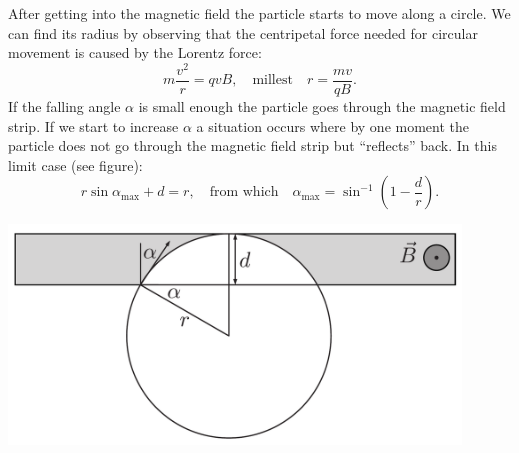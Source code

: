 {\ifEngSolution
After getting into the magnetic field the particle starts to move along a circle. We can find its radius by observing that the centripetal force needed for circular movement is caused by the Lorentz force:
\[m\frac{v^2}{r}=qvB, \quad \text{millest} \quad r=\frac{mv}{qB}.\]
If the falling angle $\alpha$ is small enough the particle goes through the magnetic field strip. If we start to increase $\alpha$ a situation occurs where by one moment the particle does not go through the magnetic field strip but “reflects” back. In this limit case (see figure):
\[r\sin\alpha_\text{max}+d=r, \quad \text{from which} \quad \alpha_\text{max}=\sin^{-1}\left(1-\frac{d}{r}\right).\]
\begin{center}
\includegraphics[width=0.9\textwidth]{2013-lahg-02-magPeegLah}
\end{center}
\fi
}